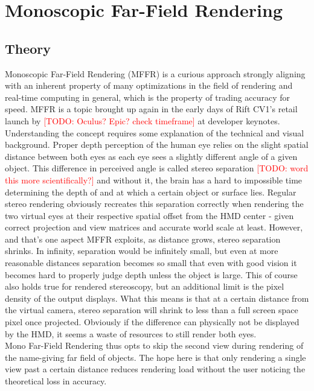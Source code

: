 
\section{Monoscopic Far-Field Rendering}
\subsection{Theory}
Monoscopic Far-Field Rendering (MFFR) is a curious approach strongly aligning with an inherent property of many optimizations in the field of rendering and real-time computing in general, which is the property of trading accuracy for speed. MFFR is a topic brought up again in the early days of Rift CV1's retail launch by \textcolor{red}{[TODO: Oculus? Epic? check timeframe]} at developer keynotes. \\
Understanding the concept requires some explanation of the technical and visual background. Proper depth perception of the human eye relies on the slight spatial distance between both eyes as each eye sees a slightly different angle of a given object. This difference in perceived angle is called stereo separation \textcolor{red}{[TODO: word this more scientifically?]} and without it, the brain has a hard to impossible time determining the depth of and at which a certain object or surface lies. Regular stereo rendering obviously recreates this separation correctly when rendering the two virtual eyes at their respective spatial offset from the HMD center - given correct projection and view matrices and accurate world scale at least. 
However, and that's one aspect MFFR exploits, as distance grows, stereo separation shrinks. In infinity, separation would be infinitely small, but even at more reasonable distances separation becomes so small that even with good vision it becomes hard to properly judge depth unless the object is large. This of course also holds true for rendered stereoscopy, but an additional limit is the pixel density of the output displays. What this means is that at a certain distance from the virtual camera, stereo separation will shrink to less than a full screen space pixel once projected. Obviously if the difference can physically not be displayed by the HMD, it seems a waste of resources to still render both eyes. \\
Mono Far-Field Rendering thus opts to skip the second view during rendering of the name-giving far field of objects. The hope here is that only rendering a single view past a certain distance reduces rendering load without the user noticing the theoretical loss in accuracy. 
